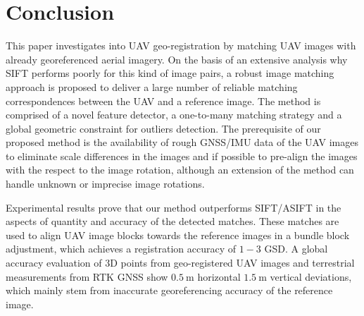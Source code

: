 \section{Conclusion}
\label{sec:conclusion}
This paper investigates into UAV geo-registration by matching UAV images with already georeferenced aerial imagery. 
On the basis of an extensive analysis why SIFT performs poorly for this kind of image pairs, a robust image matching approach is proposed to deliver a large number of reliable matching correspondences between the UAV and a reference image. 
The method is comprised of a novel feature detector, a one-to-many matching strategy and a global geometric constraint for outliers detection. 
The prerequisite of our proposed method is the availability of rough GNSS/IMU data of the UAV images to eliminate scale differences in the images and if possible to pre-align the images with the respect to the image rotation, although an extension of the method can handle unknown or imprecise image rotations.

Experimental results prove that our method outperforms SIFT/ASIFT in the aspects of quantity and accuracy of the detected matches. 
These matches are used to align UAV image blocks towards the reference images in a bundle block adjustment, which achieves a registration accuracy of $1-3$ GSD. 
A global accuracy evaluation of 3D points from geo-registered UAV images and terrestrial measurements from RTK GNSS show $\SI{0.5}{\m}$ horizontal $\SI{1.5}{\m}$ vertical deviations, which mainly stem from inaccurate georeferencing accuracy of the reference image.




